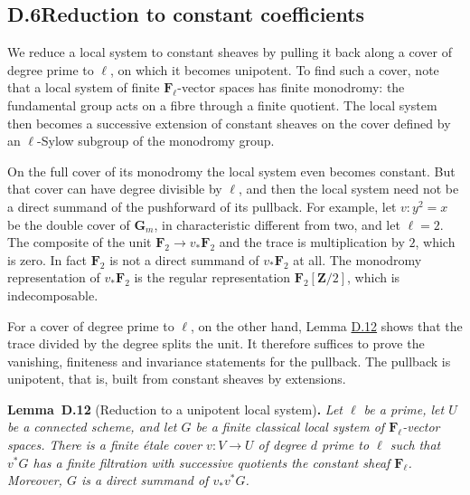 \documentclass[11pt]{article}
\newenvironment{bpstatement}[2]{\par\addvspace{0.6\baselineskip}\noindent\textbf{#1}#2\textbf{.}\enspace\ignorespaces}
  {\par\addvspace{0.4\baselineskip}}
\newenvironment{bpstatementit}[2]{\begin{bpstatement}{#1}{#2}\itshape\ignorespaces}{\end{bpstatement}}
\begin{document}
\subsection*{\texorpdfstring{D.6\quad Reduction to constant coefficients}{D.6 Reduction to constant coefficients}}
\label{bp42}%
\label{bp43}%
We reduce a local system to constant sheaves by pulling it back along a cover of degree prime to \(\ell\), on which it becomes unipotent. To find such a cover, note that a local system of finite \(\mathbf F_\ell\)-vector spaces has finite monodromy: the fundamental group acts on a fibre through a finite quotient. The local system then becomes a successive extension of constant sheaves on the cover defined by an \(\ell\)-Sylow subgroup of the monodromy group.

On the full cover of its monodromy the local system even becomes constant. But that cover can have degree divisible by \(\ell\), and then the local system need not be a direct summand of the pushforward of its pullback. For example, let \(v:y^2=x\) be the double cover of \(\mathbf G_m\), in characteristic different from two, and let \(\ell=2\). The composite of the unit \(\mathbf F_2\to v_*\mathbf F_2\) and the trace is multiplication by \(2\), which is zero. In fact \(\mathbf F_2\) is not a direct summand of \(v_*\mathbf F_2\) at all. The monodromy representation of \(v_*\mathbf F_2\) is the regular representation \(\mathbf F_2[\mathbf Z/2]\), which is indecomposable.

For a cover of degree prime to \(\ell\), on the other hand, Lemma \hyperref[bp44]{D.12} shows that the trace divided by the degree splits the unit. It therefore suffices to prove the vanishing, finiteness and invariance statements for the pullback. The pullback is unipotent, that is, built from constant sheaves by extensions.

\label{bp44}%
\begin{bpstatementit}{Lemma~D.12}{ (Reduction to a unipotent local system)}
Let \(\ell\) be a prime, let \(U\) be a connected scheme, and let \(G\) be a finite classical local system of \(\mathbf F_\ell\)-vector spaces.  There is a finite étale cover \(v:V\to U\) of degree \(d\) prime to \(\ell\) such that \(v^*G\) has a finite filtration with successive quotients the constant sheaf \(\mathbf F_\ell\).  Moreover, \(G\) is a direct summand of \(v_*v^*G\).
\end{bpstatementit}
\end{document}
